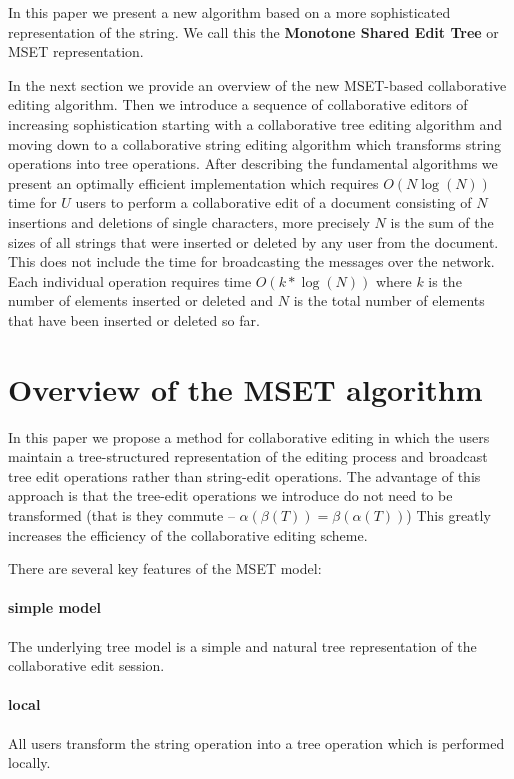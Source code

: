 \documentclass{amsart}
\begin{document}
In this paper we present a new algorithm based on a more sophisticated
representation of the string. We call this the 
{\bf Monotone Shared Edit Tree} or MSET representation. 

In the next section we provide an overview of the new MSET-based
collaborative editing algorithm.
Then we introduce a sequence of collaborative editors of increasing sophistication
starting with a collaborative tree editing algorithm and moving down to a collaborative
string editing algorithm which transforms string operations into tree operations.
After describing the fundamental algorithms we present an optimally efficient
implementation which requires $O(N\log(N))$ time for $U$ users to perform
a collaborative edit of a document consisting of $N$ insertions and deletions of
single characters, more precisely $N$ is the sum of the sizes of all strings that
were inserted or deleted by any user from the document. This does not include the
time for broadcasting the messages over the network. Each individual operation
requires time $O(k*\log(N))$ where $k$ is the number of elements inserted or deleted
and $N$ is the total number of elements that have been inserted or deleted so far.

\newpage
\section{Overview of the MSET algorithm}

In this paper we propose a method for collaborative editing in which the
users maintain a tree-structured representation of the editing process and
broadcast tree edit operations rather than string-edit operations. The advantage
of this approach is that the tree-edit operations we introduce do not need to be transformed
(that is they commute -- $\alpha(\beta(T)) = \beta(\alpha(T))$) This greatly increases
the efficiency of the collaborative editing scheme. 


There are several key features of the MSET model:

\paragraph{\bf simple model}
The underlying tree model is a simple and natural tree representation
of the collaborative edit session.

\paragraph{\bf local}
All users transform the string operation into a tree operation
which is performed locally.
\end{document}
